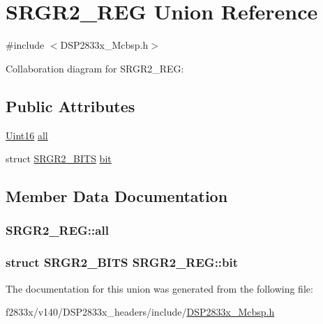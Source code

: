 \hypertarget{union_s_r_g_r2___r_e_g}{}\section{S\+R\+G\+R2\+\_\+\+R\+E\+G Union Reference}
\label{union_s_r_g_r2___r_e_g}


{\ttfamily \#include $<$D\+S\+P2833x\+\_\+\+Mcbsp.\+h$>$}



Collaboration diagram for S\+R\+G\+R2\+\_\+\+R\+E\+G\+:
\subsection*{Public Attributes}
\begin{DoxyCompactItemize}
\item 
\hyperlink{_d_s_p2833x___device_8h_a59a9f6be4562c327cbfb4f7e8e18f08b}{Uint16} \hyperlink{union_s_r_g_r2___r_e_g_a8a4ebb0b0a047ffe147ae580b585ef10}{all}
\item 
struct \hyperlink{struct_s_r_g_r2___b_i_t_s}{S\+R\+G\+R2\+\_\+\+B\+I\+T\+S} \hyperlink{union_s_r_g_r2___r_e_g_a618a638153e2c94a25de2f28e1b34d52}{bit}
\end{DoxyCompactItemize}


\subsection{Member Data Documentation}
\hypertarget{union_s_r_g_r2___r_e_g_a8a4ebb0b0a047ffe147ae580b585ef10}{}
\subsubsection[{all}]{ S\+R\+G\+R2\+\_\+\+R\+E\+G\+::all}\label{union_s_r_g_r2___r_e_g_a8a4ebb0b0a047ffe147ae580b585ef10}
\hypertarget{union_s_r_g_r2___r_e_g_a618a638153e2c94a25de2f28e1b34d52}{}
\subsubsection[{bit}]{\setlength{\rightskip}{0pt plus 5cm}struct {\bf S\+R\+G\+R2\+\_\+\+B\+I\+T\+S} S\+R\+G\+R2\+\_\+\+R\+E\+G\+::bit}\label{union_s_r_g_r2___r_e_g_a618a638153e2c94a25de2f28e1b34d52}


The documentation for this union was generated from the following file\+:\begin{DoxyCompactItemize}
\item 
f2833x/v140/\+D\+S\+P2833x\+\_\+headers/include/\hyperlink{_d_s_p2833x___mcbsp_8h}{D\+S\+P2833x\+\_\+\+Mcbsp.\+h}\end{DoxyCompactItemize}
